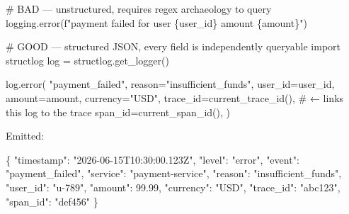 \documentclass[11pt]{article}
\newenvironment{Shaded}{\begin{snugshade}}{\end{snugshade}}
\newcommand{\CommentTok}[1]{\textcolor[rgb]{0.48,0.49,0.49}{#1}}
\newcommand{\DataTypeTok}[1]{\textcolor[rgb]{0.16,0.50,0.73}{#1}}
\newcommand{\FloatTok}[1]{\textcolor[rgb]{0.96,0.45,0.00}{#1}}
\newcommand{\FunctionTok}[1]{\textcolor[rgb]{0.56,0.27,0.68}{#1}}
\newcommand{\ImportTok}[1]{\textcolor[rgb]{0.15,0.68,0.38}{#1}}
\newcommand{\NormalTok}[1]{\textcolor[rgb]{0.81,0.81,0.76}{#1}}
\newcommand{\OperatorTok}[1]{\textcolor[rgb]{0.81,0.81,0.76}{#1}}
\newcommand{\SpecialCharTok}[1]{\textcolor[rgb]{0.24,0.68,0.91}{#1}}
\newcommand{\SpecialStringTok}[1]{\textcolor[rgb]{0.85,0.27,0.33}{#1}}
\newcommand{\StringTok}[1]{\textcolor[rgb]{0.96,0.31,0.31}{#1}}
\begin{document}

\begin{Shaded}
\begin{Highlighting}[]
\CommentTok{\# BAD — unstructured, requires regex archaeology to query}
\NormalTok{logging.error(}\SpecialStringTok{f"payment failed for user }\SpecialCharTok{\{}\NormalTok{user\_id}\SpecialCharTok{\}}\SpecialStringTok{ amount }\SpecialCharTok{\{}\NormalTok{amount}\SpecialCharTok{\}}\SpecialStringTok{"}\NormalTok{)}

\CommentTok{\# GOOD — structured JSON, every field is independently queryable}
\ImportTok{import}\NormalTok{ structlog}
\NormalTok{log }\OperatorTok{=}\NormalTok{ structlog.get\_logger()}

\NormalTok{log.error(}
    \StringTok{"payment\_failed"}\NormalTok{,}
\NormalTok{    reason}\OperatorTok{=}\StringTok{"insufficient\_funds"}\NormalTok{,}
\NormalTok{    user\_id}\OperatorTok{=}\NormalTok{user\_id,}
\NormalTok{    amount}\OperatorTok{=}\NormalTok{amount,}
\NormalTok{    currency}\OperatorTok{=}\StringTok{"USD"}\NormalTok{,}
\NormalTok{    trace\_id}\OperatorTok{=}\NormalTok{current\_trace\_id(),   }\CommentTok{\# ← links this log to the trace}
\NormalTok{    span\_id}\OperatorTok{=}\NormalTok{current\_span\_id(),}
\NormalTok{)}
\end{Highlighting}
\end{Shaded}

Emitted:


\begin{Shaded}
\begin{Highlighting}[]
\FunctionTok{\{}
  \DataTypeTok{"timestamp"}\FunctionTok{:} \StringTok{"2026{-}06{-}15T10:30:00.123Z"}\FunctionTok{,}
  \DataTypeTok{"level"}\FunctionTok{:} \StringTok{"error"}\FunctionTok{,}
  \DataTypeTok{"event"}\FunctionTok{:} \StringTok{"payment\_failed"}\FunctionTok{,}
  \DataTypeTok{"service"}\FunctionTok{:} \StringTok{"payment{-}service"}\FunctionTok{,}
  \DataTypeTok{"reason"}\FunctionTok{:} \StringTok{"insufficient\_funds"}\FunctionTok{,}
  \DataTypeTok{"user\_id"}\FunctionTok{:} \StringTok{"u{-}789"}\FunctionTok{,}
  \DataTypeTok{"amount"}\FunctionTok{:} \FloatTok{99.99}\FunctionTok{,}
  \DataTypeTok{"currency"}\FunctionTok{:} \StringTok{"USD"}\FunctionTok{,}
  \DataTypeTok{"trace\_id"}\FunctionTok{:} \StringTok{"abc123"}\FunctionTok{,}
  \DataTypeTok{"span\_id"}\FunctionTok{:} \StringTok{"def456"}
\FunctionTok{\}}
\end{Highlighting}
\end{Shaded}
\end{document}
